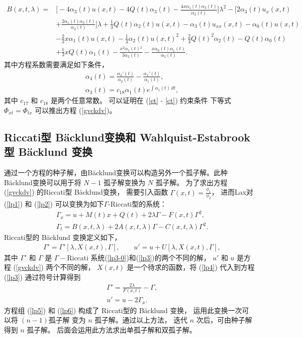 \begin{align}
\nonumber
B(x,t,\lambda )=&\big[-4 \alpha _3(t) u(x,t)-4 Q(t) \alpha _3(t)
-\frac{4 x \alpha _1(t) \alpha _3(t)}{\alpha _2(t)}\big]\lambda^2
 -\big[ 2 \alpha _3(t) u_{x}(x,t) \\
&+\frac{2 \alpha _1(t) \alpha _3(t)}{\alpha _2(t)}\big]\lambda
+ \frac{1}{3} Q(t) \alpha _2(t) u(x,t)-\alpha _3(t) u_{xx}(x,t)
-\alpha _0(t) u(x,t)
\\
\nonumber
&-\frac{2}{3} x \alpha _1(t) u(x,t)-\frac{1}{3} \alpha _2(t) u(x,t)^2
+\frac{2}{3} Q(t)^2 \alpha _2(t)-Q(t) \alpha _0(t)
\\
\nonumber
&+\frac{1}{3} x Q(t) \alpha _1(t)-\frac{x^2 \alpha _1(t){}^2}{3 \alpha _2(t)}-\frac{x \alpha _0(t) \alpha _1(t)}{\alpha _2(t)}.
\end{align}
其中方程系数需要满足如下条件，
\begin{align}
&\alpha _4(t)=\frac{\alpha _2'(t)}{\alpha _2(t)}-\frac{\alpha _1'(t)}{\alpha _1(t)} , \\
&\alpha _3(t)=c_{18} \alpha _1(t) e^{\int \alpha _1(t) \, dt} ,
\label{l1}
\end{align}
其中 $c_{17}$ 和 $c_{18}$ 是两个任意常数。 可以证明在 (\ref{et} - \ref{ct}) 约束条件 下等式 $\Phi_ {xt}=\Phi_ {tx}$ 可以推出方程 (\ref{gvckdv})。

\subsection{ Riccati型  B\"{a}cklund变换和 Wahlquist-Estabrook型 B\"{a}cklund 变换}
通过一个方程的种子解，由B\"{a}cklund变换可以构造另外一个孤子解。此种B\"{a}cklund变换可以用于将 $N-1$ 孤子解变换为 $N$ 孤子解。 为了求出方程 (\ref{gvckdv}) 的Riccati型 B\"{a}cklund变换， 需要引入函数 $\Gamma(x,t)=\frac{\phi_1}{\phi_2}$， 进而Lax对 (\ref{lp1}) 和 (\ref{lp2}) 可以变换为如下$\Gamma$-Riccati型的系统：
\begin{align}
&\Gamma_x=u+M(t)x+Q(t)+2 \lambda \Gamma - F(x,t)\Gamma^2,\label{lp3-0}\\
&\Gamma_t=B(x,t,\lambda) + 2 A(x,t,\lambda) \Gamma - C(x,t,\lambda) \Gamma^2.\label{lp3}
\end{align}
Riccati型的 B\"{a}cklund 变换定义如下，
\begin{align}
& \Gamma'=\Gamma'[\lambda,X(x,t),\Gamma], \qquad
 u'=u+U[\lambda,X(x,t),\Gamma],\label{lp4}
\end{align}
其中 $\Gamma'$ 和 $\Gamma$ 是 $\Gamma-$Riccati 系统(\ref{lp3-0})和(\ref{lp3})的两个不同的解， $u'$
和 $u$ 是方程 (\ref{gvckdv}) 两个不同的解， $X(x,t)$ 是一个待求的函数，将 (\ref{lp4}) 代入到方程 (\ref{lp3}) 通过符号计算得到
\begin{align}
& \Gamma'=\frac{2 \lambda}{F(x,t)}-\Gamma,\label{lp5}\\
& u'=u-2\Gamma_x.\label{lp6}
\end{align}
方程组 (\ref{lp5}) 和 (\ref{lp6}) 构成了 Riccati型的 B\"{a}cklund 变换，
运用此变换一次可以将 $(n-1)$孤子解 变为 $n$ 孤子解。通过以上方法， 迭代 $n$ 次后，可由种子解得到 $n$ 孤子解。
后面会运用此方法求出单孤子解和双孤子解。

